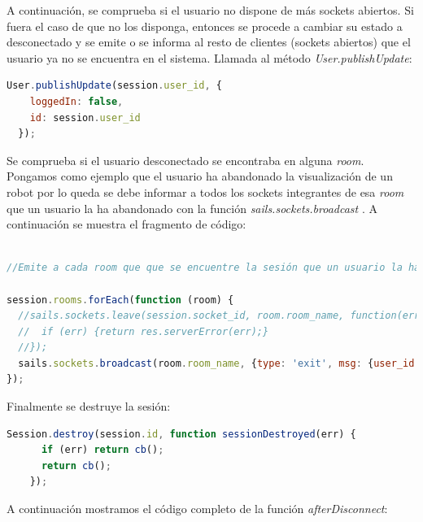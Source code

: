 A continuación, se comprueba si el usuario no dispone de más sockets abiertos. Si fuera el caso de que no los disponga, entonces se procede a cambiar su estado a desconectado y se emite o se informa al resto de clientes (sockets abiertos)
que el usuario ya no se encuentra en el sistema. Llamada al método \emph{User.publishUpdate}: \\

\begin{lstlisting}[language=JavaScript]
   User.publishUpdate(session.user_id, {
    loggedIn: false,
    id: session.user_id
  });
\end{lstlisting}


Se comprueba si el usuario desconectado se encontraba en alguna \emph{room}. Pongamos como ejemplo que el usuario ha abandonado la visualización de un robot por lo queda
se debe informar a todos los sockets integrantes de esa \emph{room} que un usuario la ha abandonado con la función \emph{ sails.sockets.broadcast }. A continuación se muestra el fragmento de código:\\


\begin{lstlisting}[language=JavaScript]

//Emite a cada room que que se encuentre la sesión que un usuario la ha abandonado

session.rooms.forEach(function (room) {
  //sails.sockets.leave(session.socket_id, room.room_name, function(err) {
  //  if (err) {return res.serverError(err);}
  //});
  sails.sockets.broadcast(room.room_name, {type: 'exit', msg: {user_id: session.user_id}});
});

\end{lstlisting}



Finalmente se destruye la sesión:\\

\begin{lstlisting}[language=JavaScript]
    Session.destroy(session.id, function sessionDestroyed(err) {
      if (err) return cb();
      return cb();
    });
\end{lstlisting}


A continuación mostramos el código completo de la función \emph{afterDisconnect}:\\


